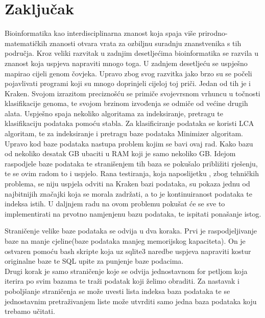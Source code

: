\documentclass[times, utf8, zavrsni]{fer}
\begin{document}
{\chapter{Zaključak}
Bioinformatika kao interdisciplinarna znanost koja spaja više prirodno-matematičkih znanosti otvara vrata za ozbiljnu suradnju znanstvenika s tih područja. Kroz veliki razvitak u zadnjim desetljećima bioinformatika se razvila u znanost koja uspjeva napraviti mnogo toga. U zadnjem desetljeću se uspješno mapirao cijeli genom čovjeka. Upravo zbog svog razvitka jako brzo su se počeli pojavlivati programi koji su mnogo doprinjeli cijeloj toj priči. Jedan od tih je i Kraken. Svojom izrazitom preciznošću se primiče svojevrsnom vrhuncu u točnosti klasifikacije genoma, te svojom brzinom izvođenja se odmiče od većine drugih alata. Uspješno spaja nekoliko algoritama za indeksiranje, pretragu te klasifikaciju podataka pomoću stabla. Za klasificiranje podataka se koristi LCA algoritam, te za indeksiranje i pretragu baze podataka Minimizer algoritam. Upravo kod baze podataka nastupa problem kojim se bavi ovaj rad. Kako bazu od nekoliko desatak GB ubaciti u RAM koji je samo nekoliko GB. Idejom raspodjele baze podataka te stranišenjem tih baza se pokušalo približiti rješenju, te se ovim radom to i uspjelo. Rana testiranja, koja naposlijetku , zbog tehničkih problema, se niju uspjela odviti na Kraken bazi podataka, su pokaza jednu od najbitnijih značajki koja se morala zadržati, a to je kontinuiranost podataka te indeksa istih. U daljnjem radu na ovom problemu pokušat će se sve to implementirati na prvotno namjenjenu bazu podataka, te ispitati ponašanje istog.



\nocite{Kraken}
\nocite{Bigdatabases}
\nocite{minim}
\nocite{jellyfish}
\nocite{lca1}
\nocite{lca3}
\nocite{lca2}


\begin{sazetak}
Straničenje velike baze podataka se odvija u dva koraka. Prvi je raspodjeljivanje baze na manje cjeline(baze podataka manjeg memorijskog kapaciteta). On je ostvaren pomoću bash skripte koja uz sqlite3 naredbe uspjeva napraviti kostur originalne baze te SQL upite za punjenje baze podacima.\\
Drugi  korak je samo straničenje koje se odvija jednostavnom for petljom koja iterira po svim bazama te traži podatak koji želimo obraditi. Za nastavak i poboljšanje straničenja se može uvesti lista indeksa baza podataka te se jednostavnim pretraživanjem liste može utvrditi samo jedna baza podataka koju trebamo učitati.


\end{sazetak}}
\end{document}
